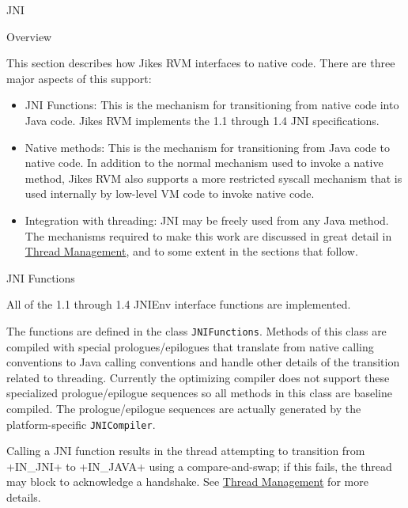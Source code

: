 \begin{section}{JNI}
\label{sec:jni}

\begin{subsection}{Overview}

This section describes how Jikes RVM interfaces to native code. There are three major aspects of this support:
\begin{itemize}
  \item JNI Functions: This is the mechanism for transitioning from native code into Java code. Jikes RVM implements the 1.1 through 1.4 JNI specifications.
  \item Native methods: This is the mechanism for transitioning from Java code to native code. In addition to the normal mechanism used to invoke a native method, Jikes RVM also supports a more restricted syscall mechanism that is used internally by low-level VM code to invoke native code.
  \item Integration with threading: JNI may be freely used from any Java method. The mechanisms required to make this work are discussed in great detail in \hyperref[sec:threadmanagement]{Thread Management}, and to some extent in the sections that follow.
\end{itemize}

\end{subsection}

\begin{subsection}{JNI Functions}

All of the 1.1 through 1.4 JNIEnv interface functions are implemented.

The functions are defined in the class \texttt{JNI\-Func\-tions}. Methods of this class are compiled with special prologues/epilogues that translate from native calling conventions to Java calling conventions and handle other details of the transition related to threading. Currently the optimizing compiler does not support these specialized prologue/epilogue sequences so all methods in this class are baseline compiled. The prologue/epilogue sequences are actually generated by the platform-specific \texttt{JNI\-Com\-pi\-ler}.

Calling a JNI function results in the thread attempting to transition from \spverb+IN_JNI+ to \spverb+IN_JAVA+ using a compare-and-swap; if this fails, the thread may block to acknowledge a handshake. See \hyperref[sec:threadmanagement]{Thread Management} for more details.

\end{subsection}


\end{section}
